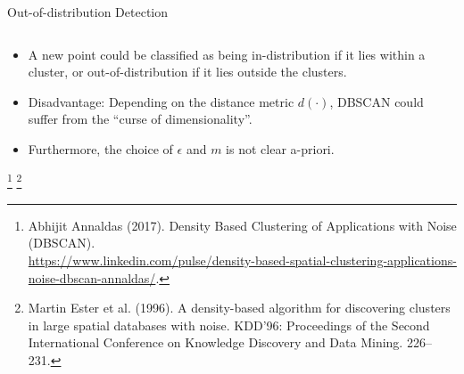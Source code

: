 \documentclass[11pt,compress,t,notes=noshow, xcolor=table]{beamer}
\begin{document}
\begin{frame}{Out-of-distribution Detection}
\begin{columns}
\begin{column}{0.27\textwidth}
\begin{center}
		\end{center}
	\end{column}
\end{columns}
\begin{itemize}
		\item A new point could be classified as being in-distribution if it lies within a cluster, or out-of-distribution if it lies outside the clusters. 
		\item Disadvantage: Depending on the distance metric $d(\cdot)$, DBSCAN could suffer from the ``curse of dimensionality''. 
		\item Furthermore, the choice of $\epsilon$ and $m$ is not clear a-priori. 
\end{itemize}
	\footnote[frame]{Abhijit Annaldas (2017). Density Based Clustering of Applications with Noise (DBSCAN).\\ \url{https://www.linkedin.com/pulse/density-based-spatial-clustering-applications-noise-dbscan-annaldas/}.}
	\footnote[frame]{Martin Ester et al. (1996). A density-based algorithm for discovering clusters in large spatial databases with noise. KDD'96: Proceedings of the Second International Conference on Knowledge Discovery and Data Mining. 226–231.}
\end{frame}
\end{document}
